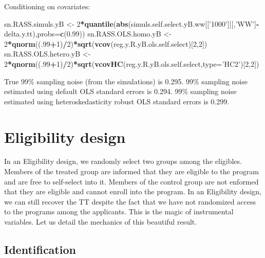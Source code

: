 \documentclass[]{book}
\newenvironment{Shaded}{\begin{snugshade}}{\end{snugshade}}
\newcommand{\DataTypeTok}[1]{\textcolor[rgb]{0.13,0.29,0.53}{#1}}
\newcommand{\DecValTok}[1]{\textcolor[rgb]{0.00,0.00,0.81}{#1}}
\newcommand{\FloatTok}[1]{\textcolor[rgb]{0.00,0.00,0.81}{#1}}
\newcommand{\KeywordTok}[1]{\textcolor[rgb]{0.13,0.29,0.53}{\textbf{#1}}}
\newcommand{\NormalTok}[1]{#1}
\newcommand{\OperatorTok}[1]{\textcolor[rgb]{0.81,0.36,0.00}{\textbf{#1}}}
\newcommand{\StringTok}[1]{\textcolor[rgb]{0.31,0.60,0.02}{#1}}
\theoremstyle{definition}
\theoremstyle{definition}
\theoremstyle{definition}
\theoremstyle{remark}
\begin{document}
Conditioning on covariates:

\begin{Shaded}
\begin{Highlighting}[]
\NormalTok{sn.RASS.simuls.yB <-}\StringTok{ }\DecValTok{2}\OperatorTok{*}\KeywordTok{quantile}\NormalTok{(}\KeywordTok{abs}\NormalTok{(simuls.self.select.yB.ww[[}\StringTok{'1000'}\NormalTok{]][,}\StringTok{'WW'}\NormalTok{]}\OperatorTok{-}\NormalTok{delta.y.tt),}\DataTypeTok{probs=}\KeywordTok{c}\NormalTok{(}\FloatTok{0.99}\NormalTok{))}
\NormalTok{sn.RASS.OLS.homo.yB <-}\StringTok{ }\DecValTok{2}\OperatorTok{*}\KeywordTok{qnorm}\NormalTok{((.}\DecValTok{99}\OperatorTok{+}\DecValTok{1}\NormalTok{)}\OperatorTok{/}\DecValTok{2}\NormalTok{)}\OperatorTok{*}\KeywordTok{sqrt}\NormalTok{(}\KeywordTok{vcov}\NormalTok{(reg.y.R.yB.ols.self.select)[}\DecValTok{2}\NormalTok{,}\DecValTok{2}\NormalTok{])}
\NormalTok{sn.RASS.OLS.hetero.yB <-}\StringTok{ }\DecValTok{2}\OperatorTok{*}\KeywordTok{qnorm}\NormalTok{((.}\DecValTok{99}\OperatorTok{+}\DecValTok{1}\NormalTok{)}\OperatorTok{/}\DecValTok{2}\NormalTok{)}\OperatorTok{*}\KeywordTok{sqrt}\NormalTok{(}\KeywordTok{vcovHC}\NormalTok{(reg.y.R.yB.ols.self.select,}\DataTypeTok{type=}\StringTok{'HC2'}\NormalTok{)[}\DecValTok{2}\NormalTok{,}\DecValTok{2}\NormalTok{])}
\end{Highlighting}
\end{Shaded}

True 99\% sampling noise (from the simulations) is 0.295.
99\% sampling noise estimated using default OLS standard errors is 0.294.
99\% sampling noise estimated using heteroskedasticity robust OLS standard errors is 0.299.

\hypertarget{sec:design3}{%
\section{Eligibility design}\label{sec:design3}}

In an Eligibility design, we randomly select two groups among the eligibles.
Members of the treated group are informed that they are eligible to the program and are free to self-select into it.
Members of the control group are not enformed that they are eligible and cannot enroll into the program.
In an Eligibility design, we can still recover the TT despite the fact that we have not randomized access to the programs among the applicants.
This is the magic of instrumental variables.
Let us detail the mechanics of this beautiful result.

\hypertarget{identification-2}{%
\subsection{Identification}\label{identification-2}}
\end{document}
